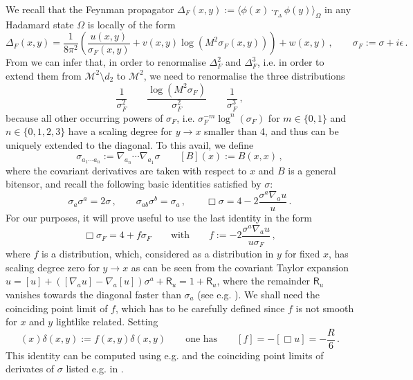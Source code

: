 \documentclass[10pt]{book}
\newcommand{\Mcal}{\mathcal{M}}
\newcommand{\Rsf}{\mathsf{R}}
\theoremstyle{break}
\begin{document}
We recall that the Feynman propagator  $\Delta_F(x,y):=\langle\phi(x)\cdot_{T_\Delta}\phi(y)\rangle_\Omega$ in any Hadamard state $\Omega$ is locally of the form
%
\begin{equation*}%
\Delta_F(x,y)=\frac{1}{8\pi^2}\left(\frac{u(x,y)}{\sigma_F(x,y)}+v(x,y)\log(M^2 \sigma_F(x,y))\right)+w(x,y)\,,\qquad\sigma_F:=\sigma+i\epsilon\,.
\end{equation*}
%
From %
we can infer that, in order to renormalise $\Delta^2_F$ and $\Delta^3_F$, i.e. in order to extend them from $\Mcal^2\setminus d_2$ to $\Mcal^2$, we need to renormalise the three distributions
%
\begin{equation*}%
\frac{1}{\sigma_F^2}\qquad \frac{\log \left(M^2 \sigma_F\right)}{\sigma_F^2}\qquad \frac{1}{\sigma_F^3}\,,
\end{equation*}
%
because all other occurring powers of $\sigma_F$, i.e. $\sigma^{-m}_F\log^n (\sigma_F)$ for $m\in\{0,1\}$ and $n\in\{0,1,2,3\}$ have a scaling degree for $y\to x$ smaller than 4, and thus can be uniquely extended to the diagonal. To this avail, we define
$$\sigma_{a_1\cdots a_n}:=\nabla_{a_n}\cdots\nabla_{a_1}\sigma\qquad [B](x):=B(x,x)\,,$$
where the covariant derivatives are taken with respect to $x$ and $B$ is a general bitensor, and recall the following basic identities satisfied by $\sigma$:
\begin{equation*}%
\sigma_a \sigma^a  = 2\sigma\,,\qquad \sigma_{ab}\sigma^b=\sigma_a\,,\qquad \Box\sigma = 4 - 2 \frac{\sigma^a \nabla_a u}{u}\,.
\end{equation*}
For our purposes, it will prove useful to use the last identity in the form
\begin{equation*}%
\Box \sigma_F = 4 + f \sigma_F\qquad\text{with}\qquad f:=- 2 \frac{\sigma^a \nabla_a u}{u\sigma_F}\,,
\end{equation*}
where $f$ is a distribution, which, considered as a distribution in $y$ for fixed $x$, has scaling degree zero for $y\to x$ as can be seen from the covariant Taylor expansion $u=[u]+\left([\nabla_a u]-\nabla_a[u]\right)\sigma^a + \Rsf_u=1+\Rsf_u$, where the remainder $\Rsf_u$ vanishes towards the diagonal faster than $\sigma_a$  (see e.g. \cite{poisson_motion_2011}).
We shall need the coinciding point limit of $f$, which has to be carefully defined since $f$ is not smooth for $x$ and $y$ lightlike related.  Setting
\begin{equation*}%
[f](x)\delta(x,y) := f(x,y) \delta(x,y)\qquad \text{one has}\qquad [f]=-[\Box u]=-\frac{R}{6}\,.
\end{equation*}
This identity can be computed using e.g. \cite[Lemma III.3.2.6]{hack_backreaction_2010} 
and the coinciding point limits of derivates of $\sigma$ listed e.g. in \cite[Section III.1.2]{hack_backreaction_2010}. 
\end{document}
